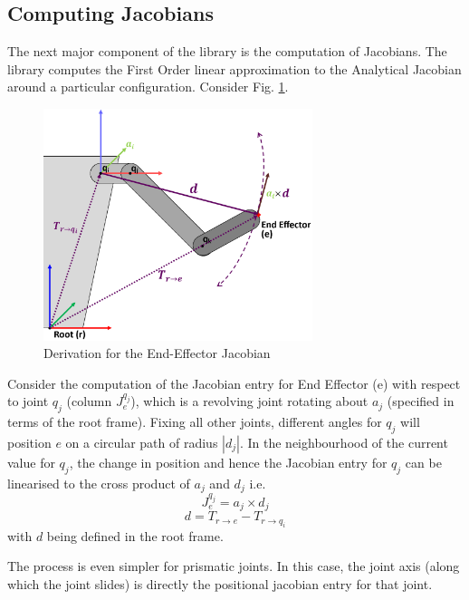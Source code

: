 \documentclass[12pt,a4paper,onecolumn]{article}
\begin{document}
\subsection{Computing Jacobians}
The next major component of the library is the computation of Jacobians. The library computes the First Order linear approximation to the Analytical Jacobian around a particular configuration. Consider Fig. \ref{FIG_EFF_JACOBIAN}. 

\begin{figure}[h]
\centering
\includegraphics[width=0.7\textwidth]{EFF_Jacobian.png}
\caption{Derivation for the End-Effector Jacobian}
\label{FIG_EFF_JACOBIAN}
\end{figure}

\noindent Consider the computation of the Jacobian entry for End Effector (e) with respect to joint $q_j$ (column $J_e^{q_j}$), which is a revolving joint rotating about $a_j$ (specified in terms of the root frame). Fixing all other joints, different angles for $q_j$ will position $e$ on a circular path of radius $|d_j|$. In the neighbourhood of the current value for $q_j$, the change in position and hence the Jacobian entry for $q_j$ can be linearised to the cross product of $a_j$ and $d_j$ i.e.
\begin{equation}
J_e^{q_j} = a_j \times d_j \label{IK_CROSS}
\end{equation}
\begin{equation}
d = T_{r\rightarrow e} - T_{r\rightarrow q_i}
\end{equation} with $d$ being defined in the root frame.

\noindent The process is even simpler for prismatic joints. In this case, the joint axis (along which the joint slides) is directly the positional jacobian entry for that joint.
\end{document}

